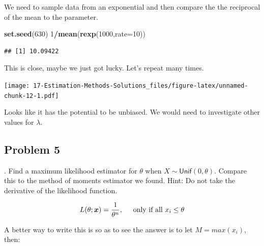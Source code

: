 \documentclass[
]{book}
\newenvironment{Shaded}{\begin{snugshade}}{\end{snugshade}}
\newcommand{\DataTypeTok}[1]{\textcolor[rgb]{0.13,0.29,0.53}{#1}}
\newcommand{\DecValTok}[1]{\textcolor[rgb]{0.00,0.00,0.81}{#1}}
\newcommand{\KeywordTok}[1]{\textcolor[rgb]{0.13,0.29,0.53}{\textbf{#1}}}
\newcommand{\NormalTok}[1]{#1}
\newcommand{\OperatorTok}[1]{\textcolor[rgb]{0.81,0.36,0.00}{\textbf{#1}}}
\newcommand{\StringTok}[1]{\textcolor[rgb]{0.31,0.60,0.02}{#1}}
\begin{document}
We need to sample data from an exponential and then compare the the reciprocal of the mean to the parameter.

\begin{Shaded}
\begin{Highlighting}[]
\KeywordTok{set.seed}\NormalTok{(}\DecValTok{630}\NormalTok{)}
\DecValTok{1}\OperatorTok{/}\KeywordTok{mean}\NormalTok{(}\KeywordTok{rexp}\NormalTok{(}\DecValTok{1000}\NormalTok{,}\DataTypeTok{rate=}\DecValTok{10}\NormalTok{))}
\end{Highlighting}
\end{Shaded}

\begin{verbatim}
## [1] 10.09422
\end{verbatim}

This is close, maybe we just got lucky. Let's repeat many times.

\begin{Shaded}
\end{Shaded}

\texttt{[image: 17-Estimation-Methods-Solutions\_files/figure-latex/unnamed-chunk-12-1.pdf]}

Looks like it has the potential to be unbiased. We would need to investigate other values for \(\lambda\).

\hypertarget{problem-5-6}{%
\subsection{Problem 5}\label{problem-5-6}}

. Find a maximum likelihood estimator for \(\theta\) when \(X\sim\textsf{Unif}(0,\theta)\). Compare this to the method of moments estimator we found. Hint: Do not take the derivative of the likelihood function.

\[
L(\theta;\boldsymbol{x})=\frac{1}{\theta^n}, \hspace{0.5cm} \mbox{only if all }x_i\leq \theta
\]

A better way to write this is so as to see the answer is to let \(M =max(x_i)\), then:
\end{document}
